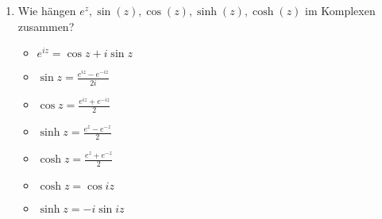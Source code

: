 \documentclass[11pt]{article}
\begin{document}
\begin{enumerate}
    \item  Wie hängen $e^z, \sin(z), \cos(z), \sinh(z), \cosh(z)$ im Komplexen zusammen?

    \begin{itemize}
        \item $e^{iz} = \cos{z} + i \sin{z}$
        \item $\sin{z} = \frac{e^{iz} - e^{-iz}}{2i}$
        \item $\cos{z} = \frac{e^{iz} + e^{-iz}}{2}$
        \item $\sinh{z} = \frac{e^{z} - e^{-z}}{2}$
        \item $\cosh{z} = \frac{e^{z} + e^{-z}}{2}$
        \item $\cosh{z} = \cos{iz}$
        \item $\sinh{z} = -i\sin{iz}$
    \end{itemize}
\end{enumerate}
\end{document}
